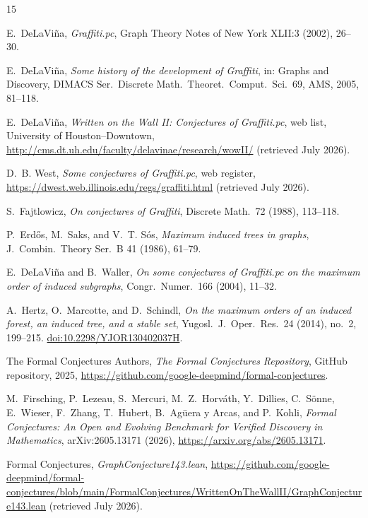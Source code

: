 \documentclass[11pt]{article}
\numberwithin{equation}{section}
\theoremstyle{remark}
\begin{document}
\begin{thebibliography}{15}

E.~DeLaVi\~na,
\emph{Graffiti.pc},
Graph Theory Notes of New York XLII:3 (2002), 26--30.

E.~DeLaVi\~na,
\emph{Some history of the development of Graffiti},
in: Graphs and Discovery, DIMACS Ser.\ Discrete Math.\ Theoret.\ Comput.\
Sci.\ 69, AMS, 2005, 81--118.

E.~DeLaVi\~na,
\emph{Written on the Wall II: Conjectures of Graffiti.pc},
web list, University of Houston--Downtown,
\url{http://cms.dt.uh.edu/faculty/delavinae/research/wowII/} (retrieved July
2026).

D.~B. West,
\emph{Some conjectures of Graffiti.pc},
web register,
\url{https://dwest.web.illinois.edu/regs/graffiti.html} (retrieved July
2026).

S.~Fajtlowicz,
\emph{On conjectures of Graffiti},
Discrete Math.\ 72 (1988), 113--118.

P.~Erd\H{o}s, M.~Saks, and V.~T. S\'os,
\emph{Maximum induced trees in graphs},
J.~Combin.\ Theory Ser.\ B 41 (1986), 61--79.

E.~DeLaVi\~na and B.~Waller,
\emph{On some conjectures of Graffiti.pc on the maximum order of induced
subgraphs},
Congr.\ Numer.\ 166 (2004), 11--32.

A.~Hertz, O.~Marcotte, and D.~Schindl,
\emph{On the maximum orders of an induced forest, an induced tree, and a
stable set},
Yugosl.\ J.\ Oper.\ Res.\ 24 (2014), no.~2, 199--215.
\href{https://doi.org/10.2298/YJOR130402037H}{doi:10.2298/YJOR130402037H}.

The Formal Conjectures Authors,
\emph{The Formal Conjectures Repository},
GitHub repository, 2025,
\url{https://github.com/google-deepmind/formal-conjectures}.

M.~Firsching, P.~Lezeau, S.~Mercuri, M.~Z.~Horv\'ath, Y.~Dillies,
C.~S\"onne, E.~Wieser, F.~Zhang, T.~Hubert, B.~Ag\"uera y Arcas,
and P.~Kohli,
\emph{Formal Conjectures: An Open and Evolving Benchmark for Verified
Discovery in Mathematics}, arXiv:2605.13171 (2026),
\url{https://arxiv.org/abs/2605.13171}.

Formal Conjectures,
\emph{GraphConjecture143.lean},
\url{https://github.com/google-deepmind/formal-conjectures/blob/main/FormalConjectures/WrittenOnTheWallII/GraphConjecture143.lean}
(retrieved July 2026).


\end{thebibliography}
\end{document}
